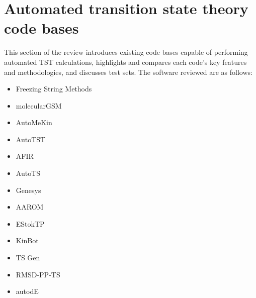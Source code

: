\documentclass[preprint, 11pt]{elsarticle} %
\begin{document}


\section{Automated transition state theory code bases}

This section of the review introduces existing code bases capable of performing automated TST calculations, highlights and compares each code's key features and methodologies, and discusses test sets.
The software reviewed are as follows:
\begin{itemize}
    \item Freezing String Methods \cite{Behn:2011}
    \item molecularGSM \cite{Peters:2004,Zimmerman:2013jctc,Zimmerman:2013jcp,Zimmerman:2015jcc}
    \item AutoMeKin \cite{Martinez:2015,Martinez:2015jccp,rodriguez:2018,mopac:2016}
    \item AutoTST \cite{Bhoorasingh:2015,bhoorasingh:2017}
    \item AFIR \cite{Maeda:2016, Madea:2018}
    \item AutoTS \cite{jacobson:2017}
    \item Genesys \cite{VANDEVIJVER:2018, vandewiele:2012}
    \item AAROM \cite{Guan:2018}
    \item EStokTP \cite{Cavallotti:2019jctc}
    \item KinBot \cite{kinbot:2018, kinbot:2019}
    \item TS Gen \cite{grambow:2020, pattanaik:2020}
    \item RMSD-PP-TS \cite{rasmussen:2020}
    \item autodE \cite{young:2020}
\end{itemize}

\end{document}
